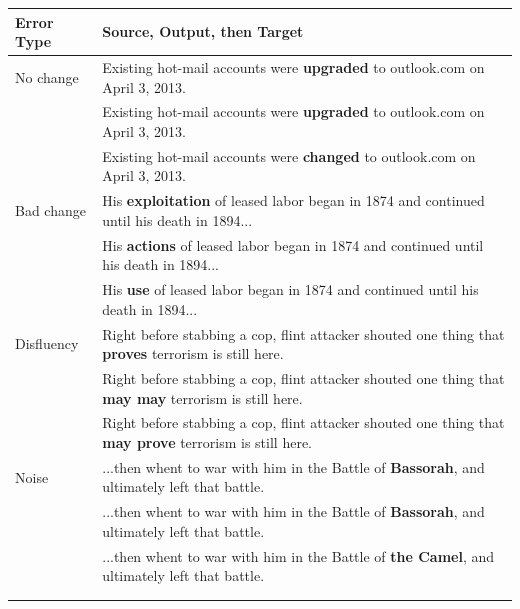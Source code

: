\begin{table}[htb]
\centering
\small
\begin{tabular}{ll}
\multicolumn{1}{l|}{\textbf{Error Type}} & \textbf{Source, Output, then Target} \\ \hline \hline
\multicolumn{1}{l|}{No change}  & Existing hot-mail accounts were \textbf{upgraded} to outlook.com on April 3, 2013. \\ 
\multicolumn{1}{l|}{}           & Existing hot-mail accounts were \textbf{upgraded} to outlook.com on April 3, 2013. \\
\multicolumn{1}{l|}{}           & Existing hot-mail accounts were \textbf{changed} to outlook.com on April 3, 2013. \\ \hline \hline
\multicolumn{1}{l|}{Bad change} & His \textbf{exploitation} of leased labor began in 1874 and continued until his death in 1894...                 \\
\multicolumn{1}{l|}{}           & His \textbf{actions} of leased labor began in 1874 and continued until his death in 1894...   \\
\multicolumn{1}{l|}{}           & His \textbf{use} of leased labor began in 1874 and continued until his death in 1894...   \\ \hline \hline
\multicolumn{1}{l|}{Disfluency} & Right before stabbing a cop, flint attacker shouted one thing that \textbf{proves} terrorism is still here. \\ 
\multicolumn{1}{l|}{}          & Right before stabbing a cop, flint attacker shouted one thing that \textbf{may may} terrorism is still here.  \\
\multicolumn{1}{l|}{}          & Right before stabbing a cop, flint attacker shouted one thing that \textbf{may prove} terrorism is still here.  \\ \hline \hline
\multicolumn{1}{l|}{Noise} & ...then whent to war with him in the Battle of \textbf{Bassorah}, and ultimately left that battle. \\ 
\multicolumn{1}{l|}{}          &  ...then whent to war with him in the Battle of \textbf{Bassorah}, and ultimately left that battle.  \\
\multicolumn{1}{l|}{}  & ...then whent to war with him in the Battle of \textbf{the Camel}, and ultimately left that battle.  \\ \\  \\ 


\end{tabular}
\end{table}

